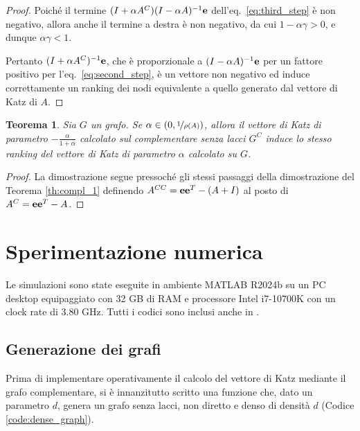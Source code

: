 \documentclass[a4paper]{article}
\newcommand{\evec}{{\bf e}}
\newtheorem{theorem}{Teorema}
\begin{document}
\begin{proof}
    Poiché il termine $(I + \alpha A^C) (I-\alpha A)^{-1} \evec$ dell'eq.~\eqref{eq:third_step} è non negativo, allora
    anche il termine a destra è non negativo, da cui
    $1 - \alpha \gamma > 0$, e dunque $\alpha \gamma < 1$.

    Pertanto $(I + \alpha A^C)^{-1} \evec$, che è proporzionale a $(I-\alpha A)^{-1} \evec$ per un fattore positivo per
    l'eq.~\eqref{eq:second_step}, è un vettore non negativo ed induce correttamente un ranking dei nodi equivalente
    a quello generato dal vettore di Katz di $A$.
\end{proof}

\begin{theorem}
    \label{th:compl_2}
    Sia $G$ un grafo. Se $\alpha \in (0, \nicefrac{1}{\rho(A)})$, allora il vettore di Katz di parametro $-\frac{\alpha}{1+\alpha}$ calcolato sul complementare senza lacci $G^C$
    induce lo stesso ranking del vettore di Katz di parametro $\alpha$ calcolato su $G$.
\end{theorem}

\begin{proof}
    La dimostrazione segue pressoché gli stessi passaggi della dimostrazione del Teorema \ref{th:compl_1} definendo
    $A^{CC} = \evec \evec^T - (A+I)$ al posto di $A^C = \evec \evec^T - A$.
\end{proof}

\section{Sperimentazione numerica}

Le simulazioni sono state eseguite in ambiente MATLAB R2024b su un PC desktop equipaggiato con 32 GB di RAM e
processore Intel i7-10700K con un clock rate di 3.80 GHz. Tutti i codici sono inclusi anche in \cite{hearotCode}.

\subsection{Generazione dei grafi}

Prima di implementare operativamente il calcolo del vettore di Katz mediante il grafo complementare, si è innanzitutto scritto
una funzione che, dato un parametro $d$, genera un grafo senza lacci, non diretto e denso di densità $d$ (Codice \ref{code:dense_graph}).
\end{document}
